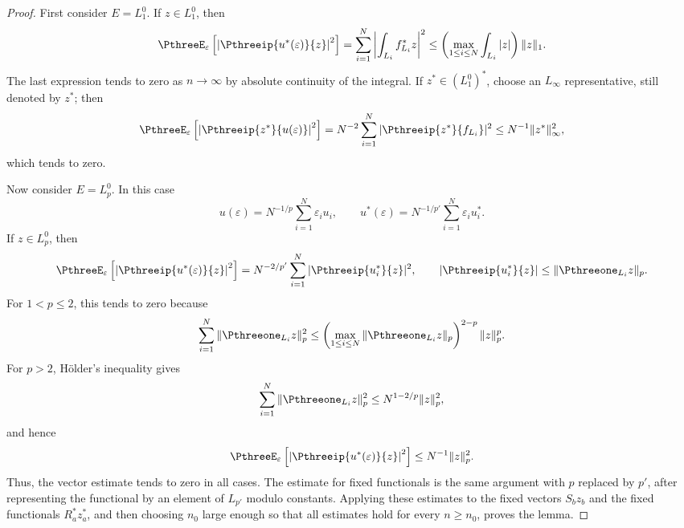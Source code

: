 \documentclass[11pt,reqno]{amsart}
\makeatletter
\theoremstyle{plain}
\theoremstyle{definition}
\newcounter{problempaper}
\newenvironment{problempaperbody}{%
  \setcounter{subsection}{0}%
  \setcounter{subsubsection}{0}%
  \setcounter{paragraph}{0}%
  \renewcommand{\thesubsection}{\arabic{subsection}}%
  \renewcommand{\thesubsubsection}{\thesubsection.\arabic{subsubsection}}%
  \renewcommand{\theparagraph}{\thesubsubsection.\arabic{paragraph}}%
  \let\problem@outersection\section
  \let\problem@outersubsection\subsection
  \let\problem@outersubsubsection\subsubsection
  \let\problem@outerparagraph\paragraph
  \let\section\problem@papersection
  \let\subsection\problem@papersubsection
  \let\subsubsection\problem@papersubsubsection
}{%
  \let\section\problem@outersection
  \let\subsection\problem@outersubsection
  \let\subsubsection\problem@outersubsubsection
  \let\paragraph\problem@outerparagraph
}
\newcommand{\problem@target}[2]{%
  \hypertarget{problem-\theproblempaper-#1-#2}{}%
}
\newcommand{\problem@paperheading}[3]{%
  \par\bigskip
  \problem@target{#1}{#2}%
  \noindent{\large\bfseries #2.\quad #3\par}%
  \nobreak\smallskip
}
\newcommand{\problem@papersubheading}[3]{%
  \par\medskip
  \problem@target{#1}{#2}%
  \noindent{\normalsize\bfseries #2.\quad #3\par}%
  \nobreak\smallskip
}
\newcommand{\problem@papersubsubheading}[3]{%
  \par\smallskip
  \problem@target{#1}{#2}%
  \noindent{\normalsize\itshape #2.\quad #3.\ }%
}
\def\problem@papersection{%
  \@ifstar{\problem@papersectionstar}{\problem@papersectionnostar}%
}
\def\problem@papersectionstar#1{%
  \par\bigskip\noindent{\large\bfseries #1\par}\nobreak\smallskip
}
\def\problem@papersectionnostar#1{%
  \refstepcounter{subsection}%
  \setcounter{subsubsection}{0}%
  \setcounter{paragraph}{0}%
  \problem@paperheading{section}{\thesubsection}{#1}%
  \problem@writecontentsline{section}{\thesubsection}{#1}%
}
\def\problem@papersubsection{%
  \@ifstar{\problem@papersubsectionstar}{\problem@papersubsectionnostar}%
}
\def\problem@papersubsectionstar#1{%
  \par\medskip\noindent{\normalsize\bfseries #1\par}\nobreak\smallskip
}
\def\problem@papersubsectionnostar#1{%
  \refstepcounter{subsubsection}%
  \setcounter{paragraph}{0}%
  \problem@papersubheading{subsection}{\thesubsubsection}{#1}%
  \problem@writecontentsline{subsection}{\thesubsubsection}{#1}%
}
\def\problem@papersubsubsection{%
  \@ifstar{\problem@papersubsubsectionstar}{\problem@papersubsubsectionnostar}%
}
\def\problem@papersubsubsectionstar#1{%
  \par\smallskip\noindent{\normalsize\itshape #1.\ }%
}
\def\problem@papersubsubsectionnostar#1{%
  \refstepcounter{paragraph}%
  \problem@papersubsubheading{subsubsection}{\theparagraph}{#1}%
  \problem@writecontentsline{subsubsection}{\theparagraph}{#1}%
}
\newcommand{\problem@writecontentsline}[3]{%
  \begingroup
  \protected@write\@auxout{}{%
    \string\problemcontentsentry{\theproblempaper}{#1}{#2}{#3}{\thepage}%
  }%
  \endgroup
}
\newcommand{\problemcontentsentry}[5]{%
  \@ifundefined{problemcontents@#1}{%
    \expandafter\gdef\csname problemcontents@#1\endcsname{}%
  }{}%
  \expandafter\g@addto@macro\csname problemcontents@#1\endcsname{%
    \problemcontentsline{#1}{#2}{#3}{#4}{#5}%
  }%
}
\newcommand{\problemcontentslink}[4]{%
  \hyperlink{problem-#1-#2-#3}{#4}%
}
\newcommand{\problemcontentsline}[5]{%
  \ifstrequal{#2}{section}{%
    \par\noindent
    \problemcontentslink{#1}{#2}{#3}{\makebox[2.5em][l]{#3}#4}%
    \nobreak\dotfill
    \problemcontentslink{#1}{#2}{#3}{#5}\par
  }{%
    \ifstrequal{#2}{subsection}{%
      \par\noindent\hspace*{1.5em}%
      \problemcontentslink{#1}{#2}{#3}{\makebox[3.5em][l]{#3}#4}%
      \nobreak\dotfill
      \problemcontentslink{#1}{#2}{#3}{#5}\par
    }{%
      \par\noindent\hspace*{3em}%
      \problemcontentslink{#1}{#2}{#3}{\makebox[4.5em][l]{#3}#4}%
      \nobreak\dotfill
      \problemcontentslink{#1}{#2}{#3}{#5}\par
    }%
  }%
}
\makeatother
\begin{document}
\begin{problempaperbody}
\begin{proof}
First consider $E=L_1^0$. If $z\in L_1^0$, then
\begin{equation*}
        \PthreeE_\varepsilon\left[\left|\Pthreeip{u^*(\varepsilon)}{z}\right|^2\right]=\sum_{i=1}^N\left|\int_{L_i}f_{L_i}^*z\right|^2\leq \left(\max_{1\leq i\leq N}\int_{L_i}|z|\right)\|z\|_1.
\end{equation*}
The last expression tends to zero as $n\to\infty$ by absolute continuity of the integral. If $z^*\in (L_1^0)^*$, choose an $L_\infty$ representative, still denoted by $z^*$; then
\begin{equation*}
        \PthreeE_\varepsilon\left[\left|\Pthreeip{z^*}{u(\varepsilon)}\right|^2\right]=N^{-2}\sum_{i=1}^N|\Pthreeip{z^*}{f_{L_i}}|^2\leq N^{-1}\|z^*\|_\infty^2,
\end{equation*}
which tends to zero.

Now consider $E=L_p^0$. In this case
\begin{equation*}
        u(\varepsilon)=N^{-1/p}\sum_{i=1}^N\varepsilon_iu_i,\qquad u^*(\varepsilon)=N^{-1/p'}\sum_{i=1}^N\varepsilon_iu_i^*.
\end{equation*}
If $z\in L_p^0$, then
\begin{equation*}
        \PthreeE_\varepsilon\left[\left|\Pthreeip{u^*(\varepsilon)}{z}\right|^2\right]=N^{-2/p'}\sum_{i=1}^N|\Pthreeip{u_i^*}{z}|^2,\qquad |\Pthreeip{u_i^*}{z}|\leq\|\Pthreeone_{L_i}z\|_p.
\end{equation*}
For $1<p\leq2$, this tends to zero because
\begin{equation*}
        \sum_{i=1}^N\|\Pthreeone_{L_i}z\|_p^2\leq \left(\max_{1\leq i\leq N}\|\Pthreeone_{L_i}z\|_p\right)^{2-p}\|z\|_p^p.
\end{equation*}
For $p>2$, H\"older's inequality gives
\begin{equation*}
        \sum_{i=1}^N\|\Pthreeone_{L_i}z\|_p^2\leq N^{1-2/p}\|z\|_p^2,
\end{equation*}
and hence
\begin{equation*}
        \PthreeE_\varepsilon\left[\left|\Pthreeip{u^*(\varepsilon)}{z}\right|^2\right]\leq N^{-1}\|z\|_p^2.
\end{equation*}
Thus, the vector estimate tends to zero in all cases. The estimate for fixed functionals is the same argument with $p$ replaced by $p'$, after representing the functional by an element of $L_{p'}$ modulo constants. Applying these estimates to the fixed vectors $S_bz_b$ and the fixed functionals $R_a^*z_a^*$, and then choosing $n_0$ large enough so that all estimates hold for every $n\geq n_0$, proves the lemma.
\end{proof}


\end{problempaperbody}
\end{document}
